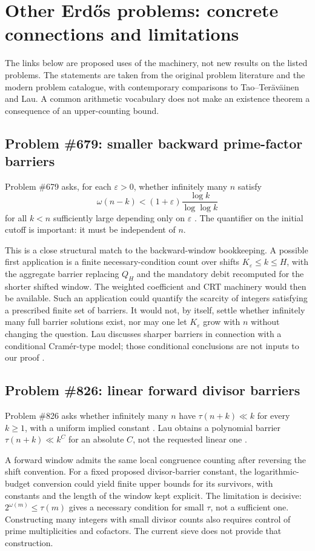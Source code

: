 \documentclass[11pt,a4paper]{article}
\theoremstyle{definition}
\theoremstyle{remark}
\numberwithin{equation}{section}
\begin{document}
\section{Other Erd\H{o}s problems: concrete connections and limitations}\label{sec:other}
The links below are proposed uses of the machinery, not new results on the
listed problems. The statements are taken from the original problem literature
and the modern problem catalogue, with contemporary comparisons to
Tao--Ter\"av\"ainen and Lau. A common arithmetic vocabulary does not make an
existence theorem a consequence of an upper-counting bound.

\subsection{Problem \#679: smaller backward prime-factor barriers}
Problem \#679 asks, for each $\varepsilon>0$, whether infinitely many $n$ satisfy
\[
 \omega(n-k)<(1+\varepsilon)\frac{\log k}{\log\log k}
\]
for all $k<n$ sufficiently large depending only on $\varepsilon$
\citep{Erdos1979Acta,Bloom679}. The quantifier on the initial cutoff is important:
it must be independent of $n$.

This is a close structural match to the backward-window bookkeeping. A possible
first application is a finite necessary-condition count over shifts
$K_\varepsilon\le k\le H$, with the aggregate barrier replacing $Q_H$ and the
mandatory debit recomputed for the shorter shifted window. The weighted
coefficient and CRT machinery would then be available. Such an application
could quantify the scarcity of integers satisfying a prescribed finite set of
barriers. It would not, by itself, settle whether infinitely many full barrier
solutions exist, nor may one let $K_\varepsilon$ grow with $n$ without changing
the question. Lau discusses sharper barriers in connection with a conditional
Cram\'er-type model; those conditional conclusions are not inputs to our proof
\citep{Lau2026}.

\subsection{Problem \#826: linear forward divisor barriers}
Problem \#826 asks whether infinitely many $n$ have
$\tau(n+k)\ll k$ for every $k\ge1$, with a uniform implied constant
\citep{Bloom826}. Lau obtains a polynomial barrier
$\tau(n+k)\ll k^C$ for an absolute $C$, not the requested linear one
\citep{Lau2026}.

A forward window admits the same local congruence counting after reversing the
shift convention. For a fixed proposed divisor-barrier constant, the
logarithmic-budget conversion could yield finite upper bounds for its
survivors, with constants and the length of the window kept explicit.
The limitation is decisive: $2^{\omega(m)}\le\tau(m)$ gives a necessary
condition for small $\tau$, not a sufficient one. Constructing many integers
with small divisor counts also requires control of prime multiplicities and
cofactors. The current sieve does not provide that construction.
\end{document}
